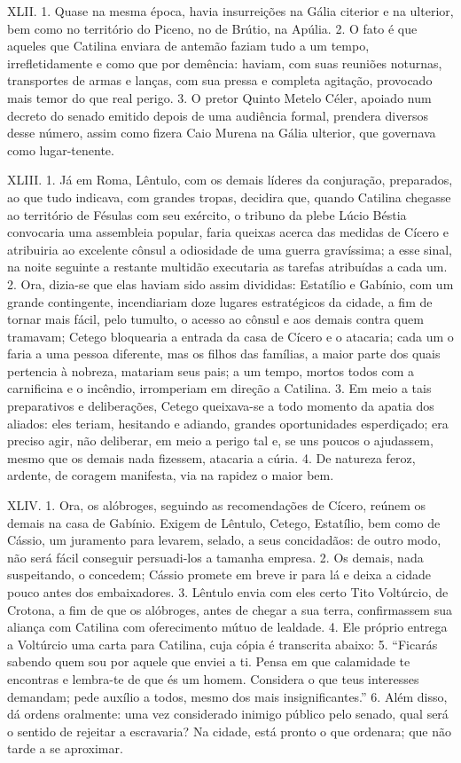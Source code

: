 XLII. 1. Quase na mesma época, havia insurreições na Gália citerior e na
ulterior, bem como no território do Piceno, no de Brútio, na Apúlia. 2. O fato
é que aqueles que Catilina enviara de antemão faziam tudo a um tempo,
irrefletidamente e como que por demência: haviam, com suas reuniões noturnas,
transportes de armas e lanças, com sua pressa e completa agitação, provocado
mais temor do que real perigo. 3. O pretor Quinto Metelo Céler, apoiado num
decreto do senado emitido depois de uma audiência formal, prendera diversos
desse número, assim como fizera Caio Murena na Gália ulterior, que governava como
lugar-tenente.

XLIII. 1. Já em Roma, Lêntulo, com os demais líderes da conjuração, preparados,
ao que tudo indicava, com grandes tropas, decidira que, quando Catilina
chegasse ao território de Fésulas com seu exército, o tribuno da plebe Lúcio
Béstia convocaria uma assembleia popular, faria queixas acerca das medidas de
Cícero e atribuiria ao excelente cônsul a odiosidade de uma guerra gravíssima;
a esse sinal, na noite seguinte a restante multidão executaria as tarefas
atribuídas a cada um. 2. Ora, dizia-se que elas haviam sido assim divididas:
Estatílio e Gabínio, com um grande contingente, incendiariam doze lugares
estratégicos da cidade, a fim de tornar mais fácil, pelo tumulto, o acesso ao
cônsul e aos demais contra quem tramavam; Cetego bloquearia a entrada da casa
de Cícero e o atacaria; cada um o faria a uma pessoa diferente, mas os filhos
das famílias, a maior parte dos quais pertencia à nobreza, matariam seus pais;
a um tempo, mortos todos com a carnificina e o incêndio, irromperiam em direção
a Catilina. 3. Em meio a tais preparativos e deliberações, Cetego queixava-se a
todo momento da apatia dos aliados: eles teriam, hesitando e adiando, grandes
oportunidades esperdiçado; era preciso agir, não deliberar, em meio a perigo
tal e, se uns poucos o ajudassem, mesmo que os demais nada fizessem, atacaria a
cúria. 4. De natureza feroz, ardente, de coragem manifesta, via na rapidez o
maior bem.

XLIV. 1. Ora, os alóbroges, seguindo as recomendações de Cícero, reúnem os
demais na casa de Gabínio. Exigem de Lêntulo, Cetego, Estatílio, bem como de
Cássio, um juramento para levarem, selado, a seus concidadãos: de outro modo,
não será fácil conseguir persuadi-los a tamanha empresa. 2. Os demais, nada
suspeitando, o concedem; Cássio promete em breve ir para lá e deixa a cidade
pouco antes dos embaixadores. 3. Lêntulo envia com eles certo Tito Voltúrcio,
de Crotona, a fim de que os alóbroges, antes de chegar a sua terra,
confirmassem sua aliança com Catilina com oferecimento mútuo de lealdade. 4.
Ele próprio entrega a Voltúrcio uma carta para Catilina, cuja cópia é
transcrita abaixo: 5. “Ficarás sabendo quem sou por aquele que enviei a ti.
Pensa em que calamidade te encontras e lembra-te de que és um homem. Considera
o que teus interesses demandam; pede auxílio a todos, mesmo dos mais
insignificantes.” 6. Além disso, dá ordens oralmente: uma vez considerado
inimigo público pelo senado, qual será o sentido de rejeitar a escravaria? Na
cidade, está pronto o que ordenara; que não tarde a se aproximar.


